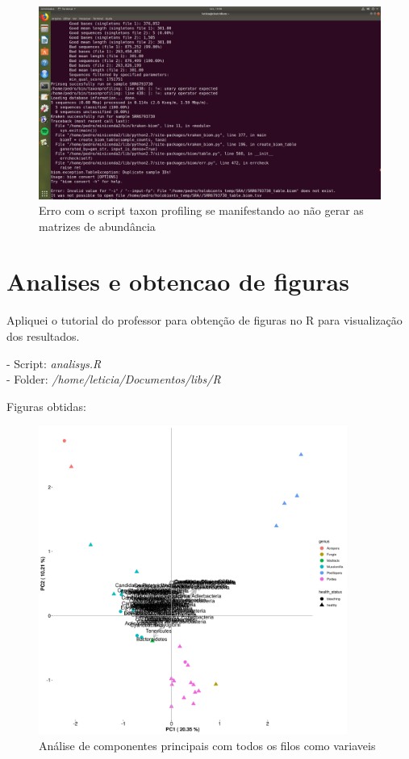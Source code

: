 \documentclass[12pt, a4paper]{report}
\begin{document}
\begin{figure}[H]
\centering
\includegraphics[scale=0.3]{figures/erro_26_10.png}
\caption{Erro com o script taxon profiling se manifestando ao não gerar as matrizes de abundância}
\end{figure}


\newpage
\section{Analises e obtencao de figuras}
Apliquei o tutorial do professor para obtenção de figuras no R para visualização dos resultados. \\
\begin{tcolorbox}[width=6.3in]
- Script: \textit{analisys.R}\\
- Folder: \textit{/home/leticia/Documentos/libs/R}
\end{tcolorbox}

Figuras obtidas:

\begin{figure}[!h]
  \centering 
  \includegraphics[width=0.9\textwidth]{figures/output_PCA_corais_2018_10_01.jpg}
  \caption{Análise de componentes principais com todos os filos como variaveis}
  \end{figure}
\end{document}
